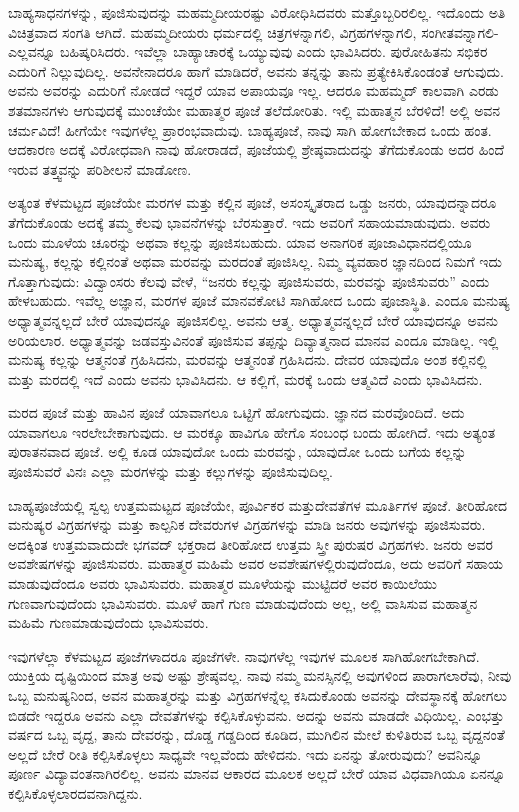 ಬಾಹ್ಯಸಾಧನಗಳನ್ನು, ಪೂಜಿಸುವುದನ್ನು ಮಹಮ್ಮದೀಯರಷ್ಟು ವಿರೋಧಿಸಿದವರು ಮತ್ತೊಬ್ಬರಿರಲಿಲ್ಲ. ಇದೊಂದು ಅತಿ ವಿಚಿತ್ರವಾದ ಸಂಗತಿ ಆಗಿದೆ. ಮಹಮ್ಮದೀಯರು ಧರ್ಮದಲ್ಲಿ ಚಿತ್ರಗಳನ್ನಾಗಲಿ, ವಿಗ್ರಹಗಳನ್ನಾಗಲಿ, ಸಂಗೀತವನ್ನಾಗಲಿ-ಎಲ್ಲವನ್ನೂ ಬಹಿಷ್ಕರಿಸಿದರು. ಇವೆಲ್ಲಾ ಬಾಹ್ಯಾಚಾರಕ್ಕೆ ಒಯ್ಯುವುವು ಎಂದು ಭಾವಿಸಿದರು. ಪುರೋಹಿತನು ಸಭಿಕರ ಎದುರಿಗೆ ನಿಲ್ಲುವುದಿಲ್ಲ. ಅವನೇನಾದರೂ ಹಾಗೆ ಮಾಡಿದರೆ, ಅವನು ತನ್ನನ್ನು ತಾನು ಪ್ರತ್ಯೇಕಿಸಿಕೊಂಡಂತೆ ಆಗುವುದು. ಅವನು ಅವರನ್ನು ಎದುರಿಗೆ ನೋಡದೆ ಇದ್ದರೆ ಯಾವ ಅಪಾಯವೂ ಇಲ್ಲ. ಆದರೂ ಮಹಮ್ಮದ್ ಕಾಲವಾಗಿ ಎರಡು ಶತಮಾನಗಳು ಆಗುವುದಕ್ಕೆ ಮುಂಚೆಯೇ ಮಹಾತ್ಮರ ಪೂಜೆ ತಲೆದೋರಿತು. ಇಲ್ಲಿ ಮಹಾತ್ಮನ ಬೆರಳಿದೆ! ಅಲ್ಲಿ ಅವನ ಚರ್ಮವಿದೆ! ಹೀಗೆಯೇ ಇವುಗಳೆಲ್ಲ ಪ್ರಾರಂಭವಾದುವು. ಬಾಹ್ಯಪೂಜೆ, ನಾವು ಸಾಗಿ ಹೋಗಬೇಕಾದ ಒಂದು ಹಂತ. ಆದಕಾರಣ ಅದಕ್ಕೆ ವಿರೋಧವಾಗಿ ನಾವು ಹೋರಾಡದೆ, ಪೂಜೆಯಲ್ಲಿ ಶ್ರೇಷ್ಠವಾದುದನ್ನು ತೆಗೆದುಕೊಂಡು ಅದರ ಹಿಂದೆ ಇರುವ ತತ್ತ್ವವನ್ನು ಪರಿಶೀಲನೆ ಮಾಡೋಣ.

ಅತ್ಯಂತ ಕೆಳಮಟ್ಟದ ಪೂಜೆಯೇ ಮರಗಳ ಮತ್ತು ಕಲ್ಲಿನ ಪೂಜೆ, ಅಸಂಸ್ಕೃತರಾದ ಒಡ್ಡು ಜನರು, ಯಾವುದನ್ನಾದರೂ ತೆಗೆದುಕೊಂಡು ಅದಕ್ಕೆ ತಮ್ಮ ಕೆಲವು ಭಾವನೆಗಳನ್ನು ಬೆರಸುತ್ತಾರೆ. ಇದು ಅವರಿಗೆ ಸಹಾಯಮಾಡುವುದು. ಅವರು ಒಂದು ಮೂಳೆಯ ಚೂರನ್ನು ಅಥವಾ ಕಲ್ಲನ್ನು ಪೂಜಿಸಬಹುದು. ಯಾವ ಅನಾಗರಿಕ ಪೂಜಾವಿಧಾನದಲ್ಲಿಯೂ ಮನುಷ್ಯ, ಕಲ್ಲನ್ನು ಕಲ್ಲಿನಂತೆ ಅಥವಾ ಮರವನ್ನು ಮರದಂತೆ ಪೂಜಿಸಿಲ್ಲ. ನಿಮ್ಮ ವ್ಯವಹಾರ ಜ್ಞಾನದಿಂದ ನಿಮಗೆ ಇದು ಗೊತ್ತಾಗುವುದು: ವಿದ್ವಾಂಸರು ಕೆಲವು ವೇಳೆ, “ಜನರು ಕಲ್ಲನ್ನು ಪೂಜಿಸುವರು, ಮರವನ್ನು ಪೂಜಿಸುವರು” ಎಂದು ಹೇಳಬಹುದು. ಇವೆಲ್ಲ ಅಜ್ಞಾನ, ಮರಗಳ ಪೂಜೆ ಮಾನವಕೋಟಿ ಸಾಗಿಹೋದ ಒಂದು ಪೂಜಾಸ್ಥಿತಿ. ಎಂದೂ ಮನುಷ್ಯ ಅಧ್ಯಾತ್ಮವನ್ನಲ್ಲದೆ ಬೇರೆ ಯಾವುದನ್ನೂ ಪೂಜಿಸಲಿಲ್ಲ. ಅವನು ಆತ್ಮ. ಅಧ್ಯಾತ್ಮವನ್ನಲ್ಲದೆ ಬೇರೆ ಯಾವುದನ್ನೂ ಅವನು ಅರಿಯಲಾರ. ಅಧ್ಯಾತ್ಮವನ್ನು ಜಡವಸ್ತುವಿನಂತೆ ಪೂಜಿಸುವ ತಪ್ಪನ್ನು ದಿವ್ಯಾತ್ಮನಾದ ಮಾನವ ಎಂದೂ ಮಾಡಿಲ್ಲ. ಇಲ್ಲಿ ಮನುಷ್ಯ ಕಲ್ಲನ್ನು ಆತ್ಮನಂತೆ ಗ್ರಹಿಸಿದನು, ಮರವನ್ನು ಆತ್ಮನಂತೆ ಗ್ರಹಿಸಿದನು. ದೇವರ ಯಾವುದೊ ಅಂಶ ಕಲ್ಲಿನಲ್ಲಿ ಮತ್ತು ಮರದಲ್ಲಿ ಇದೆ ಎಂದು ಅವನು ಭಾವಿಸಿದನು. ಆ ಕಲ್ಲಿಗೆ, ಮರಕ್ಕೆ ಒಂದು ಆತ್ಮವಿದೆ ಎಂದು ಭಾವಿಸಿದನು.

ಮರದ ಪೂಜೆ ಮತ್ತು ಹಾವಿನ ಪೂಜೆ ಯಾವಾಗಲೂ ಒಟ್ಟಿಗೆ ಹೋಗುವುದು. ಜ್ಞಾನದ ಮರವೊಂದಿದೆ. ಅದು ಯಾವಾಗಲೂ ಇರಲೇಬೇಕಾಗುವುದು. ಆ ಮರಕ್ಕೂ ಹಾವಿಗೂ ಹೇಗೊ ಸಂಬಂಧ ಬಂದು ಹೋಗಿದೆ. ಇದು ಅತ್ಯಂತ ಪುರಾತನವಾದ ಪೂಜೆ. ಅಲ್ಲಿ ಕೂಡ ಯಾವುದೋ ಒಂದು ಮರವನ್ನು, ಯಾವುದೋ ಒಂದು ಬಗೆಯ ಕಲ್ಲನ್ನು ಪೂಜಿಸುವರೆ ವಿನಃ ಎಲ್ಲಾ ಮರಗಳನ್ನು ಮತ್ತು ಕಲ್ಲುಗಳನ್ನು ಪೂಜಿಸುವುದಿಲ್ಲ.

ಬಾಹ್ಯಪೂಜೆಯಲ್ಲಿ ಸ್ವಲ್ಪ ಉತ್ತಮಮಟ್ಟದ ಪೂಜೆಯೇ, ಪೂರ್ವಿಕರ ಮತ್ತು\break ದೇವತೆಗಳ ಮೂರ್ತಿಗಳ ಪೂಜೆ. ತೀರಿಹೋದ ಮನುಷ್ಯರ ವಿಗ್ರಹಗಳನ್ನು ಮತ್ತು ಕಾಲ್ಪನಿಕ ದೇವರುಗಳ ವಿಗ್ರಹಗಳನ್ನು ಮಾಡಿ ಜನರು ಅವುಗಳನ್ನು ಪೂಜಿಸುವರು. ಅದಕ್ಕಿಂತ ಉತ್ತಮವಾದುದೇ ಭಗವದ್ ಭಕ್ತರಾದ ತೀರಿಹೋದ ಉತ್ತಮ ಸ್ತ್ರೀ ಪುರುಷರ ವಿಗ್ರಹಗಳು. ಜನರು ಅವರ ಅವಶೇಷಗಳನ್ನು ಪೂಜಿಸುವರು. ಮಹಾತ್ಮರ ಮಹಿಮೆ ಅವರ ಅವಶೇಷಗಳಲ್ಲಿರುವುದೆಂದೂ, ಅದು ಅವರಿಗೆ ಸಹಾಯ ಮಾಡುವುದೆಂದೂ ಅವರು ಭಾವಿಸುವರು. ಮಹಾತ್ಮರ ಮೂಳೆಯನ್ನು ಮುಟ್ಟಿದರೆ ಅವರ ಕಾಯಿಲೆಯು ಗುಣವಾಗುವುದೆಂದು ಭಾವಿಸುವರು. ಮೂಳೆ ಹಾಗೆ ಗುಣ ಮಾಡುವುದೆಂದು ಅಲ್ಲ, ಅಲ್ಲಿ ವಾಸಿಸುವ ಮಹಾತ್ಮನ ಮಹಿಮೆ ಗುಣಮಾಡುವುದೆಂದು ಭಾವಿಸುವರು.

ಇವುಗಳೆಲ್ಲಾ ಕೆಳಮಟ್ಟದ ಪೂಜೆಗಳಾದರೂ ಪೂಜೆಗಳೇ. ನಾವುಗಳೆಲ್ಲ ಇವುಗಳ ಮೂಲಕ ಸಾಗಿಹೋಗಬೇಕಾಗಿದೆ. ಯುಕ್ತಿಯ ದೃಷ್ಟಿಯಿಂದ ಮಾತ್ರ ಅವು ಅಷ್ಟು ಶ್ರೇಷ್ಠವಲ್ಲ. ನಾವು ನಮ್ಮ ಮನಸ್ಸಿನಲ್ಲಿ ಅವುಗಳಿಂದ ಪಾರಾಗಲಾರೆವು, ನೀವು ಒಬ್ಬ ಮನುಷ್ಯನಿಂದ, ಅವನ ಮಹಾತ್ಮರನ್ನು ಮತ್ತು ವಿಗ್ರಹಗಳನ್ನೆಲ್ಲ ಕಸಿದುಕೊಂಡು ಅವನನ್ನು ದೇವಸ್ಥಾನಕ್ಕೆ ಹೋಗಲು ಬಿಡದೇ ಇದ್ದರೂ ಅವನು ಎಲ್ಲಾ ದೇವತೆಗಳನ್ನು ಕಲ್ಪಿಸಿಕೊಳ್ಳುವನು. ಅದನ್ನು ಅವನು ಮಾಡದೇ ವಿಧಿಯಿಲ್ಲ. ಎಂಭತ್ತು ವರ್ಷದ ಒಬ್ಬ ವೃದ್ದ, ತಾನು ದೇವರನ್ನು, ದೊಡ್ಡ ಗಡ್ಡದಿಂದ ಕೂಡಿದ, ಮುಗಿಲಿನ ಮೇಲೆ ಕುಳಿತಿರುವ ಒಬ್ಬ ವೃದ್ದನಂತೆ ಅಲ್ಲದೆ ಬೇರೆ ರೀತಿ ಕಲ್ಪಿಸಿಕೊಳ್ಳಲು ಸಾಧ್ಯವೇ ಇಲ್ಲವೆಂದು ಹೇಳಿದನು. ಇದು ಏನನ್ನು ತೋರುವುದು? ಅವನಿನ್ನೂ ಪೂರ್ಣ ವಿದ್ಯಾವಂತನಾಗಿರಲಿಲ್ಲ. ಅವನು ಮಾನವ ಆಕಾರದ ಮೂಲಕ ಅಲ್ಲದೆ ಬೇರೆ ಯಾವ ವಿಧವಾಗಿಯೂ ಏನನ್ನೂ ಕಲ್ಪಿಸಿಕೊಳ್ಳಲಾರದವನಾಗಿದ್ದನು.

